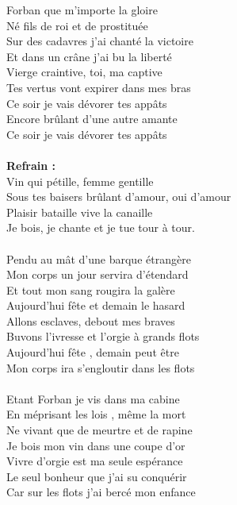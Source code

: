 
 Forban que m'importe la gloire
\\Né fils de roi et de prostituée
\\Sur des cadavres j'ai chanté la victoire
\\Et dans un crâne j'ai bu la liberté
\\Vierge craintive, toi, ma captive
\\Tes vertus vont expirer dans mes bras
\\Ce soir je vais dévorer tes appâts
\\Encore brûlant d'une autre amante
\\Ce soir je vais dévorer tes appâts
\\\\\textbf{Refrain :}
\\Vin qui pétille, femme gentille
\\Sous tes baisers brûlant d'amour, oui d'amour
\\Plaisir bataille vive la canaille
\\Je bois, je chante et je tue tour à tour.
\\\\Pendu au mât d'une barque étrangère
\\Mon corps un jour servira d'étendard
\\Et tout mon sang rougira la galère
\\Aujourd'hui fête et demain le hasard
\\Allons esclaves, debout mes braves
\\Buvons l'ivresse et l'orgie à grands flots
\\Aujourd'hui fête , demain peut être
\\Mon corps ira s'engloutir dans les flots
\\\\Etant Forban je vis dans ma cabine
\\En méprisant les lois , même la mort
\\Ne vivant que de meurtre et de rapine
\\Je bois mon vin dans une coupe d'or
\\Vivre d'orgie est ma seule espérance
\\Le seul bonheur que j'ai su conquérir
\\Car sur les flots j'ai bercé mon enfance
